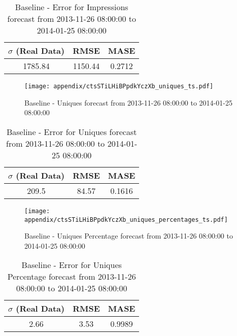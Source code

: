\begin{table}[H]
\centering
\footnotesize
\begin{tabular}{ccc}
$\sigma$ (Real Data) & RMSE & MASE   \\ \hline
1785.84 & 1150.44 & 0.2712 \\
\end{tabular}

\vspace{0.5cm}

\caption{
Baseline - Error for Impressions forecast from 2013-11-26 08:00:00 to 2014-01-25 08:00:00}
\end{table}

\begin{figure}[H] \begin{center} \leavevmode
\texttt{[image: appendix/ctsSTiLHiBPpdkYczXb\_uniques\_ts.pdf]} \caption{
Baseline - Uniques forecast from 2013-11-26 08:00:00 to 2014-01-25 08:00:00} \label{fig:appendix/ctsSTiLHiBPpdkYczXb_uniques_ts.pdf} \end{center}
\end{figure}

\begin{table}[H]
\centering
\footnotesize
\begin{tabular}{ccc}
$\sigma$ (Real Data) & RMSE & MASE   \\ \hline
209.5 & 84.57 & 0.1616 \\
\end{tabular}

\vspace{0.5cm}

\caption{
Baseline - Error for Uniques forecast from 2013-11-26 08:00:00 to 2014-01-25 08:00:00}
\end{table}

\begin{figure}[H] \begin{center} \leavevmode
\texttt{[image: appendix/ctsSTiLHiBPpdkYczXb\_uniques\_percentages\_ts.pdf]} \caption{
Baseline - Uniques Percentage forecast from 2013-11-26 08:00:00 to 2014-01-25 08:00:00} \label{fig:appendix/ctsSTiLHiBPpdkYczXb_uniques_percentages_ts.pdf} \end{center}
\end{figure}

\begin{table}[H]
\centering
\footnotesize
\begin{tabular}{ccc}
$\sigma$ (Real Data) & RMSE & MASE   \\ \hline
2.66 & 3.53 & 0.9989 \\
\end{tabular}

\vspace{0.5cm}

\caption{
Baseline - Error for Uniques Percentage forecast from 2013-11-26 08:00:00 to 2014-01-25 08:00:00}
\end{table}

